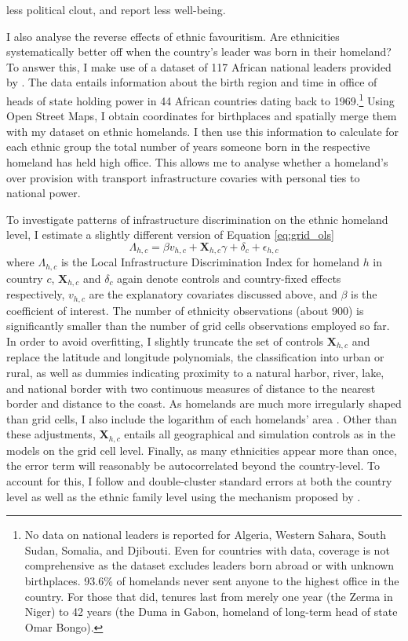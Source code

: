 \documentclass[11pt, oneside]{article}   	%
\begin{document}
less political clout, and report less well-being.

I also analyse the reverse effects of ethnic favouritism. Are ethnicities systematically better off when the country's leader was born in their homeland? To answer this, I make use of a dataset of 117 African national leaders provided by \cite{Dreher_AiddemandAfrican_2016}. The data entails information about the birth region and time in office of heads of state holding power in 44 African countries dating back to 1969.\footnote{No data on national leaders is reported for Algeria, Western Sahara, South Sudan, Somalia, and Djibouti. Even for countries with data, coverage is not comprehensive as the dataset excludes leaders born abroad or with unknown birthplaces. 93.6\% of homelands never sent anyone to the highest office in the country. For those that did, tenures last from merely one year (the Zerma in Niger) to 42 years (the Duma in Gabon, homeland of long-term head of state Omar Bongo).} Using Open Street Maps, I obtain coordinates for birthplaces and spatially merge them with my dataset on ethnic homelands. I then use this information to calculate for each ethnic group the total number of years someone born in the respective homeland has held high office. This allows me to analyse whether a homeland's over provision with transport infrastructure covaries with personal ties to national power.

To investigate patterns of infrastructure discrimination on the ethnic homeland level, I estimate a slightly different version of Equation \eqref{eq:grid_ols}
\begin{equation}
  \Lambda_{h,c} = \beta v_{h,c} + \textbf{X}_{h,c}\gamma + \delta_{c} + \epsilon_{h,c}
  \label{eq:ethn_ols}
\end{equation}
where $\Lambda_{h,c}$ is the Local Infrastructure Discrimination Index for homeland $h$ in country $c$, $\textbf{X}_{h,c}$ and $\delta_{c}$ again denote controls and country-fixed effects respectively, $v_{h,c}$ are the explanatory covariates discussed above, and $\beta$ is the coefficient of interest. The number of ethnicity observations (about 900) is significantly smaller than the number of grid cells observations employed so far. In order to avoid overfitting, I slightly truncate the set of controls $\textbf{X}_{h,c}$ and replace the latitude and longitude polynomials, the classification into urban or rural, as well as dummies indicating proximity to a natural harbor, river, lake, and national border with two continuous measures of distance to the nearest border and distance to the coast. As homelands are much more irregularly shaped than grid cells, I also include the logarithm of each homelands' area \citep{michalopoulos_long-run_2016}. Other than these adjustments, $\textbf{X}_{h,c}$ entails all geographical and simulation controls as in the models on the grid cell level. Finally, as many ethnicities appear more than once, the error term will reasonably be autocorrelated beyond the country-level. To account for this, I follow \cite{michalopoulos_long-run_2016} and double-cluster standard errors at both the country level as well as the ethnic family level using the mechanism proposed by \cite{Cameron_RobustInferenceMultiway_2011}.
\end{document}
